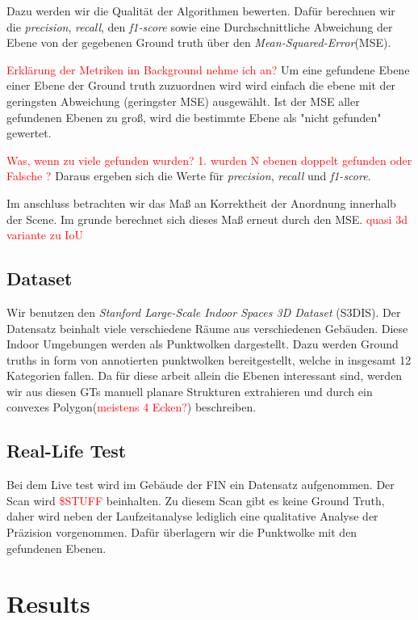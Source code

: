\documentclass[main.tex]{subfiles}
\begin{document}
Dazu werden wir die Qualität der Algorithmen bewerten. Dafür berechnen wir die \textit{precision}, \textit{recall}, den
\textit{f1-score} sowie eine Durchschnittliche Abweichung der Ebene von der gegebenen Ground truth über
den \textit{Mean-Squared-Error}(MSE).

\textcolor{red}{Erklärung der Metriken im Background nehme ich an?}
Um eine gefundene Ebene einer Ebene der Ground truth zuzuordnen wird wird einfach die ebene mit der geringsten Abweichung
(geringster MSE) ausgewählt. Ist der MSE aller gefundenen Ebenen zu groß, wird die bestimmte Ebene als "nicht gefunden" gewertet.

\textcolor{red}{Was, wenn zu viele gefunden wurden? 1. wurden N ebenen doppelt gefunden oder Falsche ?}
Daraus ergeben sich die Werte für \textit{precision}, \textit{recall} und \textit{f1-score}.

Im anschluss betrachten wir das Maß an Korrektheit der Anordnung innerhalb der Scene. Im grunde berechnet sich dieses Maß
erneut durch den MSE. \textcolor{red}{quasi 3d variante zu IoU}


\subsection{Dataset}
Wir benutzen den \textit{Stanford Large-Scale Indoor Spaces 3D Dataset} (S3DIS)\cite[]{armeni_cvpr16}.
Der Datensatz beinhalt viele verschiedene Räume aus verschiedenen Gebäuden. Diese Indoor Umgebungen werden als Punktwolken
dargestellt.
Dazu werden Ground truths in form von annotierten punktwolken bereitgestellt, welche in insgesamt 12 Kategorien fallen.
Da für diese arbeit allein die Ebenen interessant sind, werden wir aus diesen GTs manuell planare Strukturen extrahieren
und durch ein convexes Polygon(\textcolor{red}{meistens 4 Ecken?}) beschreiben.

\subsection{Real-Life Test}
Bei dem Live test wird im Gebäude der FIN ein Datensatz aufgenommen. Der Scan wird \textcolor{red}{\$STUFF} beinhalten.
Zu diesem Scan gibt es keine Ground Truth, daher wird neben der Laufzeitanalyse lediglich eine qualitative Analyse der
Präzision vorgenommen.
Dafür überlagern wir die Punktwolke mit den gefundenen Ebenen.

\section{Results}
\end{document}
